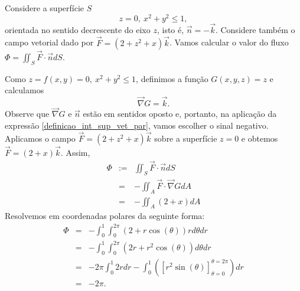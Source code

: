 \begin{ex}\label{int_sup_ex_1} Considere a superfície $S$
$$z=0,~ {x^2+y^2}\leq 1,$$
orientada no sentido decrescente do eixo $z$, isto é, $\vec{n}=-\vec{k}$. Considere também o campo vetorial dado por $\vec{F}=(2+z^2+x)\vec{k}$. Vamos calcular o valor do fluxo $\Phi=\iint_S\vec{F}\cdot \vec{n} dS$.

Como $z=f(x,y)=0,~ {x^2+y^2}\leq 1$, definimos a função $G(x,y,z) = z$ e calculamos
$$
\vec{\nabla} G=\vec{k}.
$$
Observe que $\vec{\nabla} G$ e $\vec{n}$ estão em sentidos oposto e, portanto, na aplicação da expressão \eqref{definicao_int_sup_vet_par}, vamos escolher o sinal negativo. Aplicamos o campo $\vec{F}=(2+z^2+x)\vec{k}$ sobre a superfície $z=0$ e obtemos $\vec{F}=(2+x)\vec{k}$. Assim,
\begin{eqnarray*}
\Phi&:=&\iint_{S} \vec{F}\cdot \vec{n}dS\\
&=&-\iint_A \vec{F}\cdot \vec{\nabla} G dA\\
&=&-\iint_A \left(2+x\right) dA
\end{eqnarray*}
Resolvemos em coordenadas polares da seguinte forma:
\begin{eqnarray*}
\Phi&=&-\int_0^1\int_0^{2\pi} \left(2+r\cos(\theta)\right) rd\theta dr\\
&=&-\int_0^1\int_0^{2\pi} \left(2r+r^2\cos(\theta)\right) d\theta dr\\
&=&-2\pi\int_0^{1} 2r dr-\int_0^1\left(\left[r^2\sin(\theta)\right]_{\theta=0}^{\theta=2\pi} \right)dr \\
&=&-2\pi.
\end{eqnarray*}
\end{ex}

